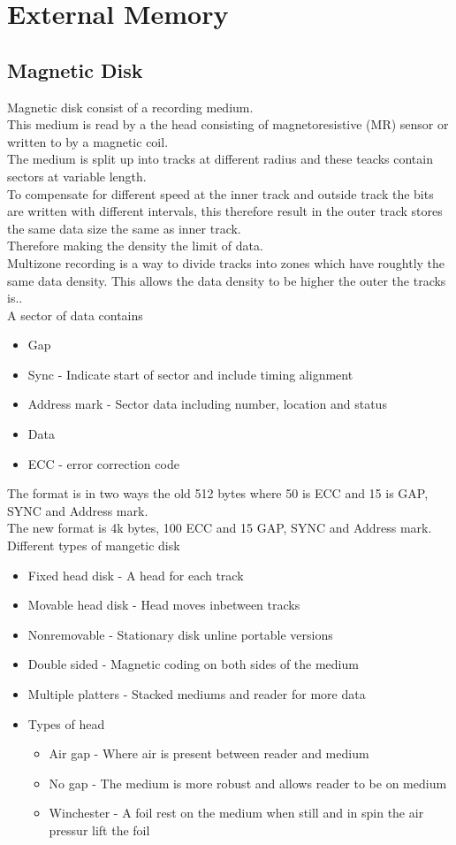 \documentclass[12pt, a4paper]{article}
\begin{document}
	\section{External Memory}
		\subsection{Magnetic Disk}
			Magnetic disk consist of a recording medium.\\
			This medium is read by a the head consisting of magnetoresistive (MR) sensor or written to by a magnetic coil.\\
			The medium is split up into tracks at different radius and these teacks contain sectors at variable length.\\
			To compensate for different speed at the inner track and outside track the bits are written with different intervals, this therefore result in the outer track stores the same data size the same as inner track.\\
			Therefore making the density the limit of data.\\
			Multizone recording is a way to divide tracks into zones which have roughtly the same data density. This allows the data density to be higher the outer the tracks is..\\
			A sector of data contains
			\begin{itemize}
				\item Gap 
				\item Sync - Indicate start of sector and include timing alignment
				\item Address mark - Sector data including number, location and status
				\item Data
				\item ECC - error correction code
			\end{itemize}
			The format is in two ways the old 512 bytes where 50 is ECC and 15 is GAP, SYNC and Address mark.\\
			The new format is 4k bytes, 100 ECC and 15 GAP, SYNC and Address mark.\\
			Different types of mangetic disk
			\begin{itemize}
				\item Fixed head disk - A head for each track
				\item Movable head disk - Head moves inbetween tracks
				\item Nonremovable - Stationary disk unline portable versions
				\item Double sided - Magnetic coding on both sides of the medium
				\item Multiple platters - Stacked mediums and reader for more data
				\item Types of head
				\begin{itemize}
					\item Air gap - Where air is present between reader and medium
					\item No gap - The medium is more robust and allows reader to be on medium
					\item Winchester - A foil rest on the medium when still and in spin the air pressur lift the foil
				\end{itemize}
			\end{itemize}
\end{document}
